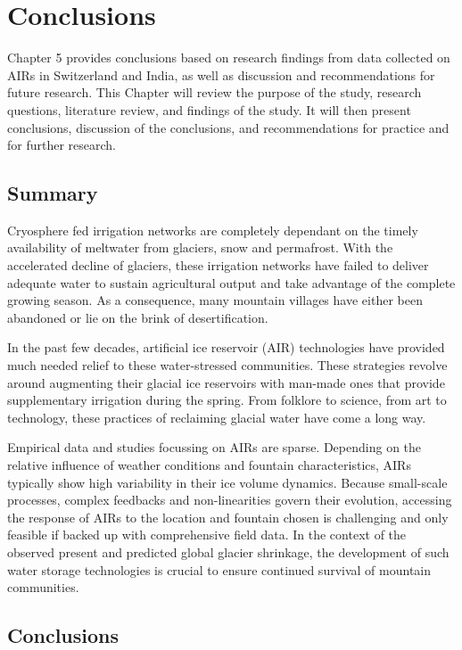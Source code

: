 \chapter{Conclusions}

Chapter 5 provides conclusions based on research findings from data collected on AIRs in Switzerland and India,
as well as discussion and recommendations for future research. This Chapter will review the purpose of the
study, research questions, literature review, and findings of the study. It will then present conclusions,
discussion of the conclusions, and recommendations for practice and for further research.

\section{Summary}

Cryosphere fed irrigation networks are completely dependant on the timely availability of meltwater from
glaciers, snow and permafrost. With the accelerated decline of glaciers, these irrigation networks have failed
to deliver adequate water to sustain agricultural output and take advantage of the complete growing season. As a
consequence, many mountain villages have either been abandoned or lie on the brink of desertification.

In the past few decades, artificial ice reservoir (AIR) technologies have provided much needed relief to these
water-stressed communities. These strategies revolve around augmenting their glacial ice reservoirs with
man-made ones that provide supplementary irrigation during the spring. From folklore to science, from art to
technology, these practices of reclaiming glacial water have come a long way. 

Empirical data and studies focussing on AIRs are sparse. Depending on the relative influence of weather
conditions and fountain characteristics, AIRs typically show high variability in their ice volume dynamics.
Because small-scale processes, complex feedbacks and non-linearities govern their evolution, accessing the
response of AIRs to the location and fountain chosen is challenging and only feasible if backed up with
comprehensive field data. In the context of the observed present and predicted global glacier shrinkage, the
development of such water storage technologies is crucial to ensure continued survival of mountain communities.

\section{Conclusions}


